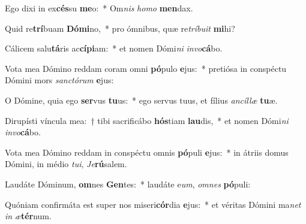 \item Ego dixi in ex\textbf{cés}su \textbf{me}o:~* Om\textit{nis} \textit{ho}\textit{mo} \textbf{men}dax.
\item Quid re\textbf{trí}buam \textbf{Dó}\textbf{mi}no,~* pro ómnibus, quæ re\textit{trí}\textit{bu}\textit{it} \textbf{mi}hi?
\item Cálicem salu\textbf{tá}ris ac\textbf{cí}\textbf{pi}am:~* et nomen Dómi\textit{ni} \textit{in}\textit{vo}\textbf{cá}bo.
\item Vota mea Dómino reddam coram omni \textbf{pó}pulo \textbf{e}jus:~* pretiósa in conspéctu Dómini mors \textit{sanc}\textit{tó}\textit{rum} \textbf{e}jus:
\item O Dómine, quia ego \textbf{ser}vus \textbf{tu}us:~* ego servus tuus, et fílius \textit{an}\textit{cíl}\textit{læ} \textbf{tu}æ.
\item Dirupísti víncula mea:~† tibi sacrificábo \textbf{hós}tiam \textbf{lau}dis,~* et nomen Dómi\textit{ni} \textit{in}\textit{vo}\textbf{cá}bo.
\item Vota mea Dómino reddam in conspéctu omnis \textbf{pó}puli \textbf{e}jus:~* in átriis domus Dómini, in médio \textit{tu}\textit{i}, \textit{Je}\textbf{rú}salem.
\item Laudáte Dóminum, \textbf{om}nes \textbf{Gen}tes:~* laudáte e\textit{um}, \textit{om}\textit{nes} \textbf{pó}puli:
\item Quóniam confirmáta est super nos miseri\textbf{cór}dia \textbf{e}jus:~* et véritas Dómini ma\textit{net} \textit{in} \textit{æ}\textbf{tér}num.
